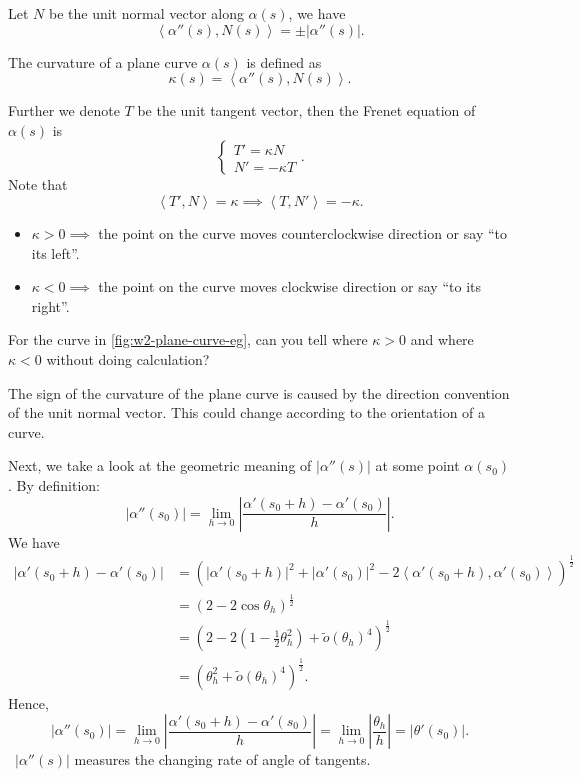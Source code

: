 Let \(N\) be the unit normal vector along \(\alpha(s)\), we have \[
    \left<\alpha''(s),N(s)\right> =\pm|\alpha''(s)|
.\] 
\begin{definition}
    The curvature of a plane curve \(\alpha(s)\) is defined as \[
        \kappa(s)=\left<\alpha''(s),N(s)\right>
    .\] 
\end{definition}
\begin{definition}
    Further we denote \(T\) be the unit tangent vector, then the Frenet equation
    of \(\alpha(s)\) is \[
        \begin{cases}
            T'=\kappa N \\
            N'=-\kappa T
        \end{cases}
    .\] Note that \[
        \left<T',N\right> =\kappa\implies \left<T,N'\right> =-\kappa
    .\] 
\end{definition}

\begin{itemize}
    \item \(\kappa>0\implies \) the point on the curve moves counterclockwise
        direction or say ``to its left''.
    \item \(\kappa<0\implies \) the point on the curve moves clockwise direction
        or say ``to its right''.
\end{itemize}

\begin{question}
    For the curve in \cref{fig:w2-plane-curve-eg}, can you tell where \(\kappa>0\)
    and where \(\kappa<0\) without doing calculation?
\end{question}

\begin{remark}
    The sign of the curvature of the plane curve is caused by the direction
    convention of the unit normal vector. This could change according to the
    orientation of a curve.
\end{remark}

Next, we take a look at the geometric meaning of \(|\alpha''(s)|\) at some point
\(\alpha(s_0)\). By definition: \[
    |\alpha''(s_0)|=\lim_{h \to 0} \left|\frac{\alpha'(s_0+h)-\alpha'(s_0)}{h}\right|
.\] 
We have
\begin{align*}
    |\alpha'(s_0+h)-\alpha'(s_0)|
    &= \left(|\alpha'(s_0+h)|^2+|\alpha'(s_0)|^2-2\left<\alpha'(s_0+h),
    \alpha'(s_0)\right> \right)^{\frac{1}{2}} \\
    &= (2-2\cos\theta_h)^{\frac{1}{2}} \\
    &= (2-2(1-\frac{1}{2}\theta_h^2)+\tilde{o}(\theta_h)^4)^{\frac{1}{2}} \\
    &= (\theta_h^2+\tilde{o}(\theta_h)^4)^{\frac{1}{2}}
.\end{align*}
Hence, \[
    |\alpha''(s_0)|=\lim_{h \to 0} \left|\frac{\alpha'(s_0+h)-\alpha'(s_0)}{h}\right|
    =\lim_{h \to 0} \left|\frac{\theta_h}{h}\right|=|\theta'(s_0)|
.\] \ie\ \(|\alpha''(s)|\) measures the changing rate of angle of tangents.

